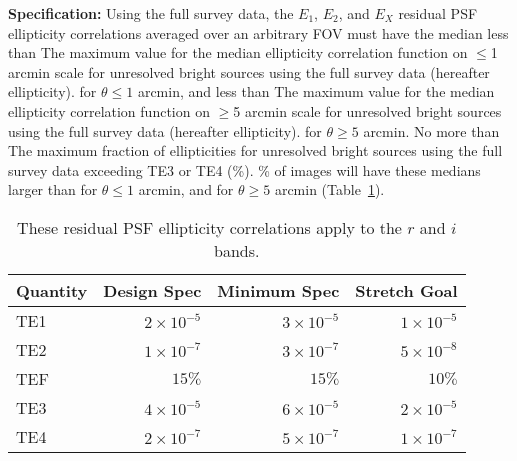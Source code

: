 {\bf Specification:} Using the full survey data, the $E_1$, $E_2$, and
$E_X$ residual PSF ellipticity correlations
averaged over an arbitrary FOV must have the median less than
{The maximum value for the median ellipticity correlation function
on $\le$1 arcmin scale for unresolved bright sources using the full survey data
(hereafter ellipticity).}
for $\theta \le 1$ arcmin, and less than
{The maximum value for the median ellipticity correlation function
on $\ge$5 arcmin scale for unresolved bright sources using the full survey data
(hereafter ellipticity).}
for $\theta \ge 5$ arcmin. No more than
{The maximum fraction of ellipticities for unresolved bright sources using the
full survey data exceeding TE3 or TE4 (\%).}
\% of images will have these medians larger than
for $\theta \le 1$ arcmin, and
for $\theta \ge 5$ arcmin (Table~\ref{fullEllip}).

\begin{table}[h]
\begin{tabular}{|l|r|r|r|}
\hline
Quantity       &   Design Spec & Minimum Spec  & Stretch Goal \\
\hline
      TE1 & $2 \times 10^{-5}$  & $3 \times 10^{-5}$ & $1 \times 10^{-5}$ \\
      TE2 & $1 \times 10^{-7}$  & $3 \times 10^{-7}$ & $5 \times 10^{-8}$ \\
      TEF & $15\%$              & $15\%$             & $10\%$             \\
      TE3 & $4 \times 10^{-5}$  & $6 \times 10^{-5}$ & $2 \times 10^{-5}$ \\
      TE4 & $2 \times 10^{-7}$  & $5 \times 10^{-7}$ & $1 \times 10^{-7}$ \\
\hline
\end{tabular}
\caption{These residual PSF ellipticity correlations apply to the $r$ and $i$ bands.}
\label{fullEllip}
\end{table}

